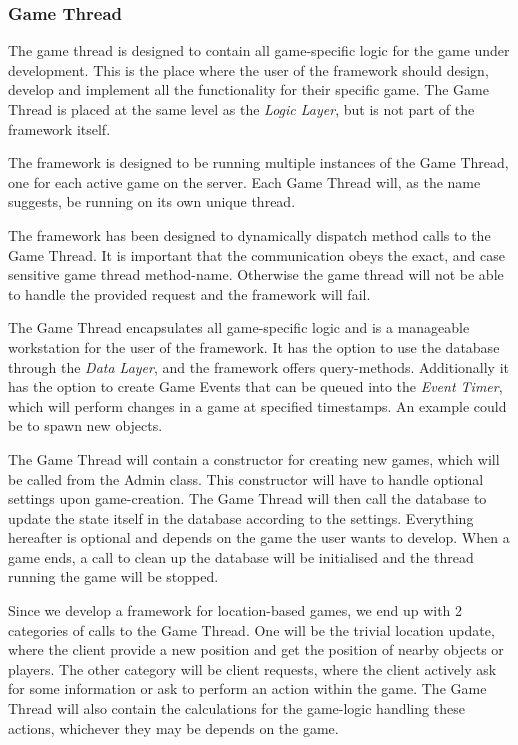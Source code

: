 \subsubsection{Game Thread}\label{designgamethread}
The game thread is designed to contain all game-specific logic for the game under development. This is the place where the user of the framework should design, develop and implement all the functionality for their specific game. The Game Thread is placed at the same level as the \textit{Logic Layer}, but is not part of the framework itself. 

The framework is designed to be running multiple instances of the Game Thread, one for each active game on the server. Each Game Thread will, as the name suggests, be running on its own unique thread. 

The framework has been designed to dynamically dispatch method calls to the Game Thread. It is important that the communication obeys the exact, and case sensitive game thread method-name. Otherwise the game thread will not be able to handle the provided request and the framework will fail. 

The Game Thread encapsulates all game-specific logic and is a manageable workstation for the user of the framework. It has the option to use the database through the \textit{Data Layer}, and the framework offers query-methods. Additionally it has the option to create Game Events that can be queued into the \textit{Event Timer}, which will perform changes in a game at specified timestamps. An example could be to spawn new objects.

The Game Thread will contain a constructor for creating new games, which will be called from the Admin class. This constructor will have to handle optional settings upon game-creation. The Game Thread will then call the database to update the state itself in the database according to the settings. Everything hereafter is optional and depends on the game the user wants to develop. When a game ends, a call to clean up the database will be initialised and the thread running the game will be stopped.

Since we develop a framework for location-based games, we end up with 2 categories of calls to the Game Thread. One will be the trivial location update, where the client provide a new position and get the position of nearby objects or players. The other category will be client requests, where the client actively ask for some information or ask to perform an action within the game. The Game Thread will also contain the calculations for the game-logic handling these actions, whichever they may be depends on the game. 